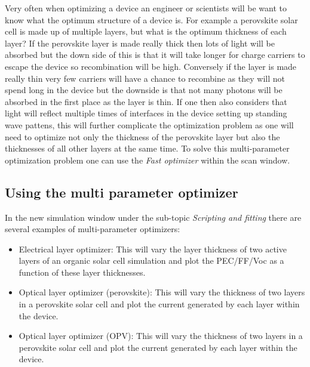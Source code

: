 Very often when optimizing a device an engineer or scientists will be want to know what the optimum structure of a device is. For example a perovskite solar cell is made up of multiple layers, but what is the optimum thickness of each layer? If the perovskite layer is made really thick then lots of light will be absorbed but the down side of this is that it will take longer for charge carriers to escape the device so recombination will be high.  Conversely if the layer is made really thin very few carriers will have a chance to recombine as they will not spend long in the device but the downside is that not many photons will be absorbed in the first place as the layer is thin.  If one then also considers that light will reflect multiple times of interfaces in the device setting up standing wave pattens, this will further complicate the optimization problem as one will need to optimize not only the thickness of the perovskite layer but also the thicknesses of all other layers at the same time. To solve this multi-parameter optimization problem one can use the \emph{Fast optimizer} within the scan window.

\subsection{Using the multi parameter optimizer}
In the new simulation window under the sub-topic \emph{Scripting and fitting} there are several examples of multi-parameter optimizers:

\begin{itemize}
  \item Electrical layer optimizer: This will vary the layer thickness of two active layers of an organic solar cell simulation and plot the PEC/FF/Voc as a function of these layer thicknesses.
  \item Optical layer optimizer (perovskite): This will vary the thickness of two layers in a perovskite solar cell and plot the current generated by each layer within the device.
  \item Optical layer optimizer (OPV): This will vary the thickness of two layers in a perovskite solar cell and plot the current generated by each layer within the device.
\end{itemize}

